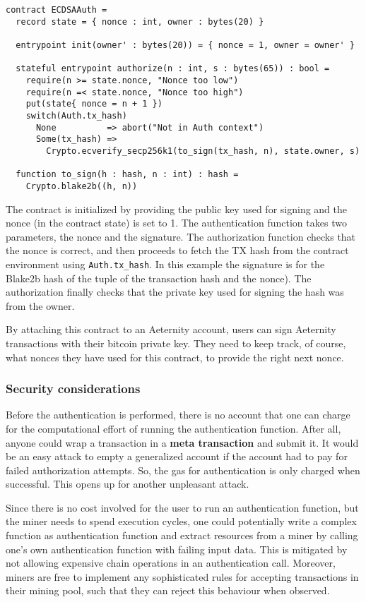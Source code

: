 \begin{verbatim}
contract ECDSAAuth =
  record state = { nonce : int, owner : bytes(20) }

  entrypoint init(owner' : bytes(20)) = { nonce = 1, owner = owner' }

  stateful entrypoint authorize(n : int, s : bytes(65)) : bool =
    require(n >= state.nonce, "Nonce too low")
    require(n =< state.nonce, "Nonce too high")
    put(state{ nonce = n + 1 })
    switch(Auth.tx_hash)
      None          => abort("Not in Auth context")
      Some(tx_hash) =>
        Crypto.ecverify_secp256k1(to_sign(tx_hash, n), state.owner, s)

  function to_sign(h : hash, n : int) : hash =
    Crypto.blake2b((h, n))

\end{verbatim}

The contract is initialized by providing the public key used for
signing and the nonce (in the contract state) is set to 1. The
authentication function takes two parameters, the nonce and the signature.
The authorization function checks that the nonce is correct, and then
proceeds to fetch the TX hash from the contract environment using
\verb+Auth.tx_hash+. In this example the signature is for the Blake2b
hash of the tuple of the transaction hash and the nonce). The
authorization finally checks that the private key used for signing the
hash was from the owner.


By attaching this contract to an Aeternity account, users can sign
Aeternity transactions with their bitcoin private key. They need to
keep track, of course, what nonces they have used for this contract,
to provide the right next nonce.

\subsubsection{Security considerations}

Before the authentication is performed, there is no account that one
can charge for the computational effort of running the authentication
function. After all, anyone could wrap a transaction in a \textbf{meta
  transaction} and submit it. It would be an easy attack to empty a
generalized account if the account had to pay for failed authorization
attempts. So, the gas for authentication is only charged when
successful. This opens up for another unpleasant attack.

Since there is no cost involved for the user to run an authentication
function, but the miner needs to spend execution cycles, one could
potentially write a complex function as authentication function and
extract resources from a miner by calling one's own authentication
function with failing input data. This is mitigated by not allowing
expensive chain operations in an authentication call. Moreover, miners
are free to implement any sophisticated rules for accepting
transactions in their mining pool, such that they can reject this
behaviour when observed.

